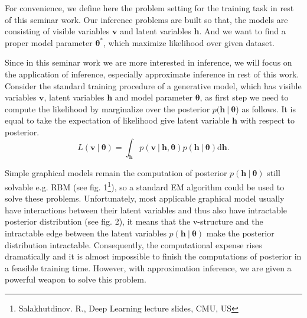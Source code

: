 \documentclass[conference]{IEEEtran}
\begin{document}
For convenience, we define here the problem setting for the training task in rest of this seminar work. Our inference problems are built so that, the models are consisting of visible variables $\boldsymbol{v}$ and latent variables $\boldsymbol{h}$. And we want to find a proper model parameter $\boldsymbol{\theta}^*$, which maximize likelihood over given dataset.

Since in this seminar work we are more interested in inference, we will focus on the application of inference, especially approximate inference in rest of this work. Consider the standard training procedure of a generative model, which has visible variables $\boldsymbol{v}$, latent variables $\boldsymbol{h}$ and model parameter $\boldsymbol{\theta}$, as first step we need to compute the likelihood by marginalize over the posterior $p(\boldsymbol{h}\ |\ \boldsymbol{\theta}$) as follows. It is equal to take the expectation of likelihood give latent variable $\boldsymbol{h}$ with respect to posterior.
\begin{equation}
  L(\boldsymbol{v}\ |\ \boldsymbol{\theta}) = \int_{\boldsymbol{h}}p(\boldsymbol{v} \ |\ \boldsymbol{h}, \boldsymbol{\theta})p(\boldsymbol{h}\ |\ \boldsymbol{\theta})\mathrm{d}\boldsymbol{h}.
\end{equation}

Simple graphical models remain the computation of posterior $p(\boldsymbol{h}\ |\ \boldsymbol{\theta})$ still solvable e.g. RBM (see fig. 1\footnote{Salakhutdinov. R., Deep Learning lecture slides, CMU, US}), so a standard EM algorithm could be used to solve these problems. Unfortunately, most applicable graphical model usually have interactions between their latent variables and thus also have intractable posterior distribution (see fig. 2), it means that the v-structure and the intractable edge between the latent variables $p(\boldsymbol{h}\ |\ \boldsymbol{\theta})$ make the posterior distribution intractable. Consequently, the computational expense rises dramatically and it is almost impossible to finish the computations of posterior in a feasible training time. However, with approximation inference, we are given a powerful weapon to solve this problem.
\end{document}
